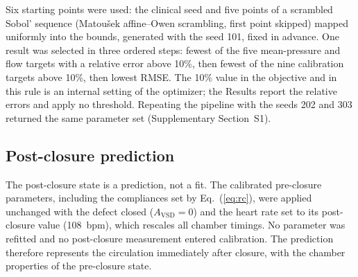 \begin{table}[!htbp]
\centering\small
\setlength{\tabcolsep}{3pt}
\caption{Calibration stages for each starting point.}
\label{tab:stages}
\end{table}

Six starting points were used: the clinical seed and five points of a scrambled Sobol' sequence (Matou\v{s}ek affine--Owen scrambling, first point skipped) mapped uniformly into the bounds, generated with the seed 101, fixed in advance. One result was selected in three ordered steps: fewest of the five mean-pressure and flow targets with a relative error above 10\%, then fewest of the nine calibration targets above 10\%, then lowest RMSE. The 10\% value in the objective and in this rule is an internal setting of the optimizer; the Results report the relative errors and apply no threshold. Repeating the pipeline with the seeds 202 and 303 returned the same parameter set (Supplementary Section~S1).

\FloatBarrier
\subsection{Post-closure prediction}
\label{sec:post_methods}
The post-closure state is a prediction, not a fit. The calibrated pre-closure parameters, including the compliances set by Eq.~(\ref{eq:rc}), were applied unchanged with the defect closed ($A_{\mathrm{VSD}} = 0$) and the heart rate set to its post-closure value (108~bpm), which rescales all chamber timings. No parameter was refitted and no post-closure measurement entered calibration. The prediction therefore represents the circulation immediately after closure, with the chamber properties of the pre-closure state.

